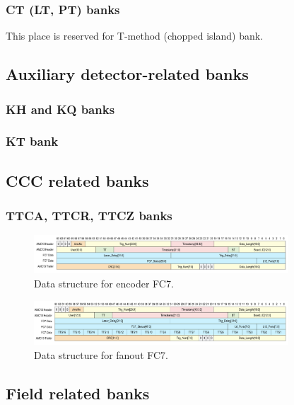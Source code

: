 \subsubsection*{CT (LT, PT) banks}

{\color{red}This place is reserved for T-method (chopped island) bank.}


\subsection{Auxiliary detector-related banks}

\subsubsection*{KH and KQ banks}

\subsubsection*{KT bank}

\subsection{CCC related banks}

\subsubsection*{TTCA, TTCR, TTCZ banks}

\begin{figure}[htbp]
\centering
\includegraphics[width=0.85\textwidth]{pics/EncoderFC7.pdf} 
\caption{Data structure for encoder FC7.}\label{fig:EncoderFC7}
\end{figure}

\begin{figure}[htbp]
\centering
\includegraphics[width=0.85\textwidth]{pics/FanoutFC7.pdf} 
\caption{Data structure for fanout FC7.}\label{fig:FanoutFC7}
\end{figure}


\subsection{Field related banks}

